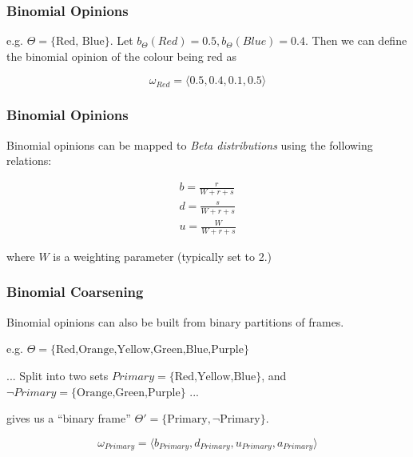 \documentclass{beamer}
\begin{document}

\begin{frame}
\frametitle{Binomial Opinions}

e.g. $\Theta = \lbrace \mbox{Red, Blue} \rbrace$.
Let $b_\Theta\left(Red\right) = 0.5, b_\Theta\left(Blue\right) = 0.4$. Then we can
define the binomial opinion of the colour being red as

$$
\omega_{Red} = \langle 0.5, 0.4, 0.1, 0.5 \rangle
$$

\end{frame}


\begin{frame}
\frametitle{Binomial Opinions}

Binomial opinions can be mapped to \emph{Beta distributions} using the following relations:

$$
\begin{array}{l}
  b = \frac{r}{W + r + s} \\
  d = \frac{s}{W + r + s} \\
  u = \frac{W}{W + r + s}
\end{array}
$$

where $W$ is a weighting parameter (typically set to 2.)

\end{frame}


\begin{frame}
\frametitle{Binomial Coarsening}

Binomial opinions can also be built from binary partitions of frames.

e.g. $\Theta = \lbrace \mbox{Red,Orange,Yellow,Green,Blue,Purple} \rbrace$

... Split into two sets $Primary = \lbrace \mbox{Red,Yellow,Blue} \rbrace$, and
$\lnot Primary = \lbrace \mbox{Orange,Green,Purple} \rbrace$ ...

gives us a ``binary frame'' $\Theta' = \lbrace \mbox{Primary}, \lnot \mbox{Primary} \rbrace$.

$$
\omega_{Primary} = \langle b_{Primary}, d_{Primary}, u_{Primary}, a_{Primary} \rangle
$$

\end{frame}

\end{document}
